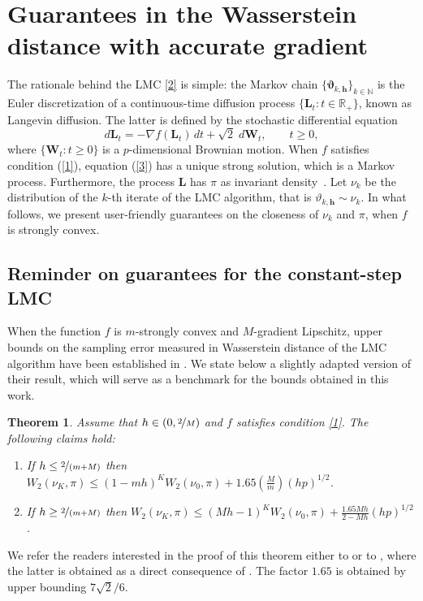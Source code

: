 \documentclass[aoap,preprint,reqno,a4paper]{imsart} %
\def\ds{\displaystyle}
\newcommand{\RR}{\mathbb{R}}
\newcommand{\NN}{\mathbb{N}}
\newcommand{\bvartheta}{\boldsymbol{\vartheta}}
\newcommand{\bh}{\boldsymbol h}
\newcommand{\bW}{\boldsymbol W\!}
\newcommand{\bL}{\boldsymbol L}
\newtheorem{theorem}{Theorem}
\begin{document}
\section{Guarantees in the Wasserstein distance with accurate gradient}
\label{sec:1}


The rationale behind the LMC \eqref{2} is simple: the Markov chain
$\{\bvartheta_{k,\bh}\}_{k\in\NN}$ is the Euler discretization of a continuous-time
diffusion process $\{\bL_t :t\in\RR_+\}$, known as Langevin diffusion. The latter is
defined by the stochastic differential equation
\begin{equation}\label{3}
d\bL_t = -\nabla f(\bL_t)\,dt + \sqrt{2} \; d\bW_t,\qquad t\ge 0,
\end{equation}
where $\{\bW_t:t\ge 0\}$ is a $p$-dimensional Brownian motion. When $f$ satisfies
condition (\ref{1}), equation (\ref{3}) has a unique strong solution, which is a Markov
process. Furthermore, the process $\bL$ has $\pi$ as invariant
density~\citep[Thm. 3.5]{bhattacharya1978}. Let $\nu_k$ be the distribution of the
$k$-th iterate of the LMC algorithm, that is $\vartheta_{k,\bh}\sim \nu_k$. In what
follows, we present user-friendly guarantees on the closeness of $\nu_k$ and $\pi$,
when $f$ is strongly convex.

\subsection{Reminder on guarantees for the constant-step LMC}


When the function $f$ is $m$-strongly convex and $M$-gradient Lipschitz,
upper bounds on the sampling error measured in Wasserstein distance of the
LMC algorithm have been established in \citep{Durmus2,DalalyanColt}.
We state below a slightly adapted version of their result, which will serve
as a benchmark for the bounds obtained in this work.

\begin{theorem}\label{thOne}
Assume that $h\in(0,\nicefrac2M)$ and $f$ satisfies condition \eqref{1}.
The following claims hold:
\begin{enumerate}\itemsep=6pt
\item[{\rm (a)}\!\!] \!\! If $h\le \nicefrac2{(m+M)}$ then $W_2(\nu_K, \pi) \le
(1-mh)^K W_2(\nu_0,\pi) + 1.65(\frac{M}{m})(hp)^{1/2}$\!\!.
\item[{\rm (b)}\!\!] \!\! If $h\ge \nicefrac2{(m+M)}$ then $W_2(\nu_K, \pi) \le
\ds (Mh-1)^K W_2(\nu_0,\pi) + \frac{1.65 Mh}{2-Mh}(hp)^{1/2}$\!\!.
\end{enumerate}
\end{theorem}
We refer the readers interested in the proof of this theorem
either to \citep{DalalyanColt} or to , where the latter is obtained
as a direct consequence of . The factor $1.65$ is obtained by
upper bounding $7\sqrt{2}/6$.
\end{document}
